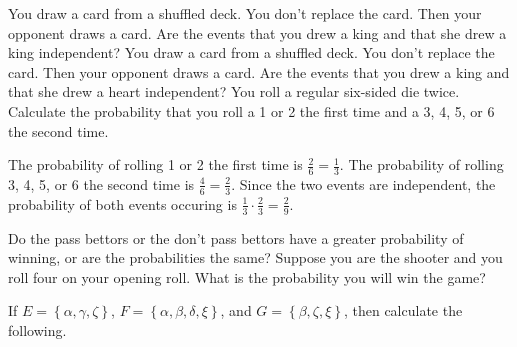 \documentclass[answers,12pt]{exam}
\begin{document}
\begin{questions}
\question You draw a card from a shuffled deck. You don't replace
the card. Then your opponent draws a card. Are the events that
you drew a king and that she drew a king independent?
\question You draw a card from a shuffled deck. You don't replace
the card. Then your opponent draws a card. Are the events that
you drew a king and that she drew a heart independent?
\question You roll a regular six-sided die twice. Calculate
the probability that you roll a 1 or 2 the first time and a
3, 4, 5, or 6 the second time.
\begin{solution} The probability of rolling 1 or 2 the first
time is $\frac{2}{6}=\frac{1}{3}$.
The probability of rolling 3, 4, 5, or 6 the second time
is $\frac{4}{6}=\frac{2}{3}$.
Since the two events are independent, the probability of both
events occuring is $\frac{1}{3}\cdot\frac{2}{3}=\frac{2}{9}$. \end{solution}

\question Do the pass bettors or the don't pass bettors have
a greater probability of winning, or are the probabilities the same?
\question Suppose you are the shooter and you roll four on your opening
roll. What is the probability you will win the game?

\question If $E=\left\{\alpha,\gamma,\zeta\right\}$,
$F=\left\{\alpha,\beta,\delta,\xi\right\}$, and
$G=\left\{\beta,\zeta,\xi\right\}$, then calculate the following.


\end{questions}
\end{document}
